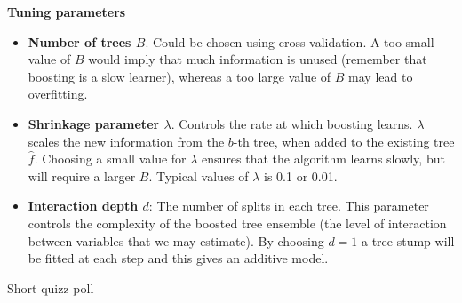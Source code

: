 \documentclass[10pt,ignorenonframetext,]{beamer}
\begin{document}
\begin{frame}

\textbf{Tuning parameters}

\begin{itemize}
\item
  \textbf{Number of trees \(B\)}. Could be chosen using
  cross-validation. A too small value of \(B\) would imply that much
  information is unused (remember that boosting is a slow learner),
  whereas a too large value of \(B\) may lead to overfitting.
\item
  \textbf{Shrinkage parameter \(\lambda\)}. Controls the rate at which
  boosting learns. \(\lambda\) scales the new information from the
  \(b\)-th tree, when added to the existing tree \(\hat{f}\). Choosing a
  small value for \(\lambda\) ensures that the algorithm learns slowly,
  but will require a larger \(B\). Typical values of \(\lambda\) is 0.1
  or 0.01.
\item
  \textbf{Interaction depth \(d\)}: The number of splits in each tree.
  This parameter controls the complexity of the boosted tree ensemble
  (the level of interaction between variables that we may estimate). By
  choosing \(d=1\) a tree stump will be fitted at each step and this
  gives an additive model.
\end{itemize}

\end{frame}

\begin{frame}

\begin{block}{Short quizz poll}

\end{block}

\end{frame}
\end{document}
